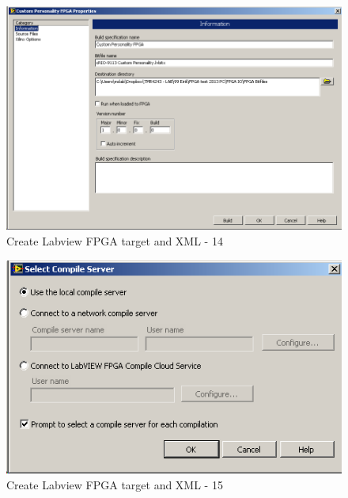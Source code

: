 \documentclass[a4paper,twoside,english]{report}
\begin{document}
\begin{figure}[!h]
\centering \includegraphics[scale=0.45]{Screenshots/Screenshot_2015-01-16_19-53-01.png}
\caption{Create Labview FPGA target and XML - 14}

\label{fig: Create Labview FPGA target and XML-14} 
\end{figure}

\begin{figure}[!h]
\centering \includegraphics[scale=0.45]{Screenshots/Screenshot_2015-01-16_19-53-25.png}
\caption{Create Labview FPGA target and XML - 15}

\label{fig: Create Labview FPGA target and XML-15} 
\end{figure}
\end{document}
